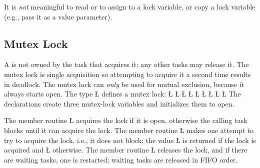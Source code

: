\documentclass[openright,twoside]{report}
\begin{document}
It is \emph{not} meaningful to read or to assign to a lock variable, or copy a lock variable (e.g., pass it as a value parameter).


\subsection{Mutex Lock}
\label{s:MutexLock}

A  is not owned by the task that acquires it;
any other tasks may release it.
The mutex lock is single acquisition so attempting to acquire it a second time results in deadlock.
The mutex lock can \emph{only} be used for mutual exclusion, because it always starts open.
The type \LGinlinetrue\LGbegin\lgrinde\L{}\endlgrinde\LGend{} defines a mutex lock:
\LGinlinefalse\LGbegin\lgrinde
\L{}
\L{}
\L{\LB{}}
\L{\LB{}}
\L{\LB{}}
\L{\LB{}}
\L{\LB{\};}}
\L{}
\L{}
\endlgrinde\LGend
{}%
%
%
The declarations create three mutex-lock variables and initializes them to open.

The member routine \LGinlinetrue\LGbegin\lgrinde\L{}\endlgrinde\LGend{} acquires the lock if it is open, otherwise the calling task blocks until it can acquire the lock.
The member routine \LGinlinetrue\LGbegin\lgrinde\L{}\endlgrinde\LGend{} makes one attempt to try to acquire the lock, i.e., it does not block;
the value \LGinlinetrue\LGbegin\lgrinde\L{}\endlgrinde\LGend{} is returned if the lock is acquired and \LGinlinetrue\LGbegin\lgrinde\L{}\endlgrinde\LGend{} otherwise.
The member routine \LGinlinetrue\LGbegin\lgrinde\L{}\endlgrinde\LGend{} releases the lock, and if there are waiting tasks, one is restarted;
waiting tasks are released in FIFO order.
\end{document}
